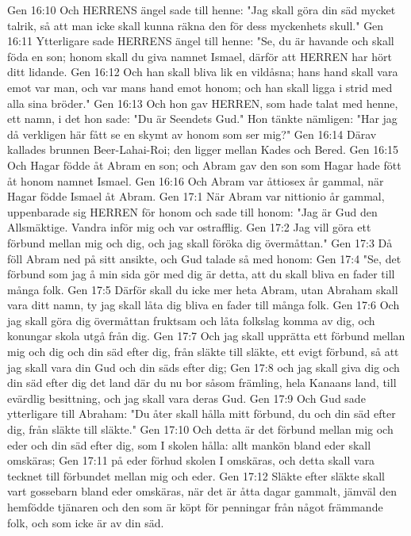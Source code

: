 Gen 16:10  Och HERRENS ängel sade till henne: "Jag skall göra din säd mycket talrik, så att man icke skall kunna räkna den för dess myckenhets skull."
Gen 16:11  Ytterligare sade HERRENS ängel till henne: "Se, du är havande och skall föda en son; honom skall du giva namnet Ismael, därför att HERREN har hört ditt lidande.
Gen 16:12  Och han skall bliva lik en vildåsna; hans hand skall vara emot var man, och var mans hand emot honom; och han skall ligga i strid med alla sina bröder."
Gen 16:13  Och hon gav HERREN, som hade talat med henne, ett namn, i det hon sade: "Du är Seendets Gud." Hon tänkte nämligen: "Har jag då verkligen här fått se en skymt av honom som ser mig?"
Gen 16:14  Därav kallades brunnen Beer-Lahai-Roi; den ligger mellan Kades och Bered.
Gen 16:15  Och Hagar födde åt Abram en son; och Abram gav den son som Hagar hade fött åt honom namnet Ismael.
Gen 16:16  Och Abram var åttiosex år gammal, när Hagar födde Ismael åt Abram.
Gen 17:1  När Abram var nittionio år gammal, uppenbarade sig HERREN för honom och sade till honom: "Jag är Gud den Allsmäktige. Vandra inför mig och var ostrafflig.
Gen 17:2  Jag vill göra ett förbund mellan mig och dig, och jag skall föröka dig övermåttan."
Gen 17:3  Då föll Abram ned på sitt ansikte, och Gud talade så med honom:
Gen 17:4  "Se, det förbund som jag å min sida gör med dig är detta, att du skall bliva en fader till många folk.
Gen 17:5  Därför skall du icke mer heta Abram, utan Abraham skall vara ditt namn, ty jag skall låta dig bliva en fader till många folk.
Gen 17:6  Och jag skall göra dig övermåttan fruktsam och låta folkslag komma av dig, och konungar skola utgå från dig.
Gen 17:7  Och jag skall upprätta ett förbund mellan mig och dig och din säd efter dig, från släkte till släkte, ett evigt förbund, så att jag skall vara din Gud och din säds efter dig;
Gen 17:8  och jag skall giva dig och din säd efter dig det land där du nu bor såsom främling, hela Kanaans land, till evärdlig besittning, och jag skall vara deras Gud.
Gen 17:9  Och Gud sade ytterligare till Abraham: "Du åter skall hålla mitt förbund, du och din säd efter dig, från släkte till släkte."
Gen 17:10  Och detta är det förbund mellan mig och eder och din säd efter dig, som I skolen hålla: allt mankön bland eder skall omskäras;
Gen 17:11  på eder förhud skolen I omskäras, och detta skall vara tecknet till förbundet mellan mig och eder.
Gen 17:12  Släkte efter släkte skall vart gossebarn bland eder omskäras, när det är åtta dagar gammalt, jämväl den hemfödde tjänaren och den som är köpt för penningar från något främmande folk, och som icke är av din säd.
